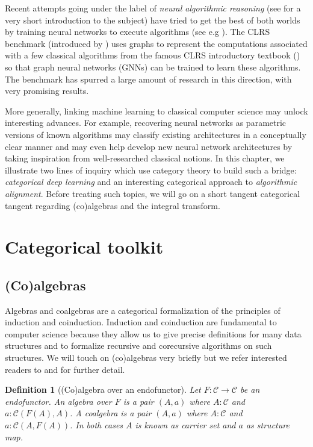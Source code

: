 \documentclass[11pt,a4paper,openright,twoside]{report}
\theoremstyle{plain}
\newtheorem{definition}[proposition]{Definition}
\theoremstyle{definition}
\begin{document}
Recent attempts going under the label of \textit{neural algorithmic reasoning} (see \cite{velivckovic2021neural} for a very short introduction to the subject) have tried to get the best of both worlds by training neural networks to execute algorithms (see e.g \cite{ibarz2022generalist}). The CLRS benchmark (introduced by \cite{velivckovic2022clrs}) uses graphs to represent the computations associated with a few classical algorithms from the famous CLRS introductory textbook (\cite{cormen2022introduction}) so that graph neural networks (GNNs) can be trained to learn these algorithms. The benchmark has spurred a large amount of research in this direction, with very promising results.


More generally, linking machine learning to classical computer science may unlock interesting advances. For example, recovering neural networks as parametric versions of known algorithms may classify existing architectures in a conceptually clear manner and may even help develop new neural network architectures by taking inspiration from well-researched classical notions. In this chapter, we illustrate two lines of inquiry which use category theory to build such a bridge: \textit{categorical deep learning} and an interesting categorical approach to \textit{algorithmic alignment}. Before treating such topics, we will go on a short tangent categorical tangent regarding (co)algebras and the integral transform.




\section{Categorical toolkit}

\subsection{(Co)algebras}
\label{subsec: algebras}

Algebras and coalgebras are a categorical formalization of the principles of induction and coinduction. Induction and coinduction are fundamental to computer science because they allow us to give precise definitions for many data structures and to formalize recursive and corecursive algorithms on such structures. We will touch on (co)algebras very briefly but we refer interested readers to \cite{jacobs1997tutorial} and \cite{wisbauer2008algebras} for further detail.

\begin{definition}[(Co)algebra over an endofunctor]
  \label{def: endalg}
  Let $F: \mathcal{C} \to \mathcal{C}$ be an endofunctor. An algebra over $F$ is a pair $(A,a)$ where $A: \mathcal{C}$ and $a:\mathcal{C}(F(A),A)$. A coalgebra is a pair $(A,a)$ where $A: \mathcal{C}$ and $a:\mathcal{C}(A,F(A))$. In both cases $A$ is known as carrier set and $a$ as structure map.
\end{definition}
\end{document}

